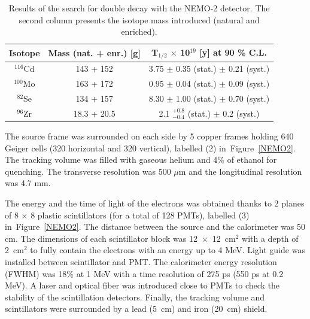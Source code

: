 \documentclass[main.tex]{subfiles}
\begin{document}
\begin{table}[h!]
\centering
\begin{tabular}{c|c|c}
Isotope           & Mass (nat. + enr.) [g] &T$_{\text{1/2}}$ $\times$ 10$^{\text{19}}$ [y] at 90 \% C.L. \\[0.05cm]
\toprule
$^{\text{116}}$Cd & 143 + 152   & 3.75 $\pm$ 0.35 (stat.) $\pm$ 0.21 (syst.)  \cite{NEMO2:Cd116}\\[0.05cm]
$^{\text{100}}$Mo & 163 + 172   & 0.95 $\pm$ 0.04 (stat.) $\pm$ 0.09 (syst.)  \cite{NEMO2:Mo100}\\[0.05cm]
$^{\text{82}}$Se  & 134 + 157   & 8.30 $\pm$ 1.00 (stat.) $\pm$ 0.70 (syst.)  \cite{NEMO2:Se82}\\[0.05cm]
$^{\text{96}}$Zr  & 18.3 + 20.5 & 2.1 $^{+\text{0.8}}_{-\text{0.4}}$ (stat.) $\pm$ 0.2 (syst.) \cite{NEMO2:Zr96} \\[0.05cm]
\bottomrule
\end{tabular}
\caption{Results of the search for double decay with the NEMO-2 detector. The second column presents the isotope mass introduced (natural and enriched).}
\label{NEMO-2-results}
\end{table}  


\bigskip


\NI The source frame was surrounded on each side by 5 copper frames holding 640 Geiger cells (320 horizontal and 320 vertical), labelled (2) in~Figure~\ref{NEMO2}. The tracking volume was filled with gaseous helium and 4\% of ethanol for quenching. The transverse resolution was 500 $\mu$m and the longitudinal resolution was 4.7 mm. 


\bigskip


\NI The energy and the time of light of the electrons was obtained thanks to 2 planes of 8 $\times$ 8 plastic scintillators (for a total of 128 PMTs), labelled (3) in~Figure~\ref{NEMO2}. The distance between the source and the calorimeter was 50 cm. The dimensions of each scintillator block was 12~$\times$~12~cm$^{\text{2}}$ with a depth of 2~cm$^{\text{2}}$ to fully contain the electrons with an energy up to 4 MeV. Light guide was installed between scintillator and PMT. The calorimeter energy resolution (FWHM) was 18\% at 1 MeV with a time resolution of 275 ps (550 ps at 0.2 MeV). A laser and optical fiber was introduced close to PMTs to check the stability of the scintillation detectors. Finally, the tracking volume and scintillators were surrounded by a lead (5~cm) and iron (20~cm) shield.
\end{document}
